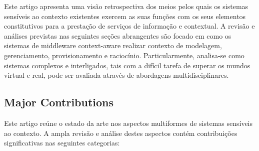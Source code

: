 \documentclass[12pt]{article} %
\begin{document}
Este artigo apresenta uma visão retrospectiva dos meios pelos quais os sistemas sensíveis ao contexto existentes exercem as suas funções com os seus elementos constitutivos para a prestação de serviços de informação e contextual. A revisão e análises previstas nas seguintes seções abrangentes são focado em como os sistemas de middleware context-aware realizar contexto de modelagem, gerenciamento, provisionamento e raciocínio. Particularmente, analisa-se como sistemas complexos e interligados, tais com a difícil tarefa de superar os mundos virtual e real, pode ser avaliada através de abordagens multidisciplinares.


\subsection{Major Contributions} %


Este artigo reúne o estado da arte nos aspectos multiformes de sistemas sensíveis ao contexto. A ampla revisão e análise destes aspectos contém contribuições significativas nas seguintes categorias:
\end{document}
